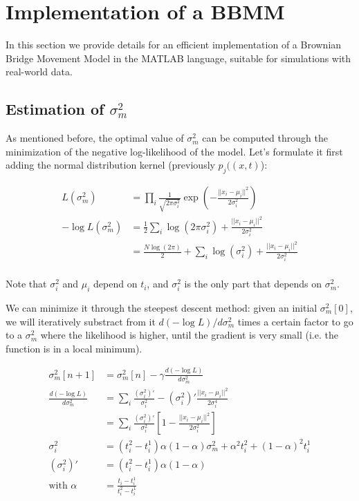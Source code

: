 \documentclass[12pt]{article}
\begin{document}
\clearpage
\section{Implementation of a BBMM}

In this section we provide details for an efficient implementation of a Brownian Bridge Movement Model in the MATLAB language, suitable for simulations with real-world data.

\subsection{Estimation of $\sigma_m^2$}

As mentioned before, the optimal value of $\sigma_m^2$ can be computed through the minimization of the negative log-likelihood of the model. Let's formulate it first adding the normal distribution kernel (previously $p_j((x,t)$):

\begin{align*}
    L(\sigma_m^2) &= \prod_i \frac{1}{\sqrt{2\pi\sigma_i^2}} \exp \left( -\frac{||x_i-\mu_i||^2}{2\sigma_i^2} \right) \\
    -\log L(\sigma_m^2) &= \frac{1}{2} \sum_i \log(2\pi\sigma_i^2) + \frac{||x_i-\mu_i||^2}{2\sigma_i^2} \\
    &= \frac{N\log(2\pi)}{2} + \sum_i \log(\sigma_i^2) + \frac{||x_i-\mu_i||^2}{2\sigma_i^2} \\
\end{align*}

Note that $\sigma_i^2$ and $\mu_i$ depend on $t_i$, and $\sigma_i^2$ is the only part that depends on $\sigma_m^2$.

We can minimize it through the steepest descent method: given an initial $\sigma_m^2[0]$, we will iteratively substract from it $d(-\log L)/d\sigma_m^2$ times a certain factor to go to a $\sigma_m^2$ where the likelihood is higher, until the gradient is very small (i.e. the function is in a local minimum).

\begin{align*}
    \sigma_m^2[n+1] &= \sigma_m^2[n] - \gamma \frac{d(-\log L)}{d\sigma_m^2} \\
    \frac{d(-\log L)}{d\sigma_m^2} &= \sum_i \frac{(\sigma_i^2)'}{\sigma_i^2} - (\sigma_i^2)'\frac{||x_i - \mu_i||^2}{2\sigma_i^4} \\
    &= \sum_i \frac{(\sigma_i^2)'}{\sigma_i^2} \left[ 1 -  \frac{||x_i - \mu_i||^2}{2\sigma_i^2} \right]\\
    \sigma_i^2 &= (t_i^2-t_i^1)\alpha(1-\alpha)\sigma_m^2 + \alpha^2t_i^2 + (1-\alpha)^2t_i^1 \\
    (\sigma_i^2)' &= (t_i^2-t_i^1)\alpha(1-\alpha) \\
    \text{with } \alpha &= \frac{t_i - t_i^1}{t_i^2 - t_i^1}
\end{align*}
\end{document}
